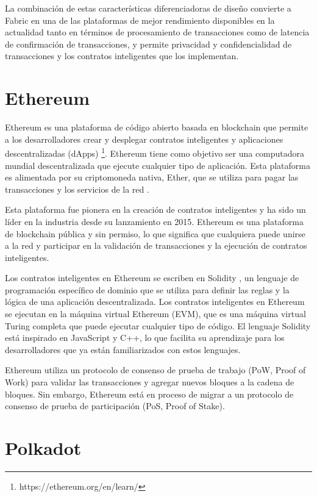 \documentclass[main.tex]{subfiles}
\begin{document}
La combinación de estas características diferenciadoras de diseño convierte a Fabric en una de las plataformas de mejor rendimiento disponibles en la actualidad tanto en términos de procesamiento de transacciones como de latencia de confirmación de transacciones, y permite privacidad y confidencialidad de transacciones y los contratos inteligentes que los implementan.

\section{Ethereum}

Ethereum es una plataforma de código abierto basada en blockchain que permite a los desarrolladores crear y desplegar contratos inteligentes y aplicaciones descentralizadas (dApps) \footnote{https://ethereum.org/en/learn/}. Ethereum tiene como objetivo ser una computadora mundial descentralizada que ejecute cualquier tipo de aplicación. Esta plataforma es alimentada por su criptomoneda nativa, Ether, que se utiliza para pagar las transacciones y los servicios de la red \cite{buterin2013ethereum}.

Esta plataforma fue pionera en la creación de contratos inteligentes y ha sido un líder en la industria desde su lanzamiento en 2015. Ethereum es una plataforma de blockchain pública y sin permiso, lo que significa que cualquiera puede unirse a la red y participar en la validación de transacciones y la ejecución de contratos inteligentes. 

Los contratos inteligentes en Ethereum se escriben en Solidity \cite{dannen2017introducing}, un lenguaje de programación específico de dominio que se utiliza para definir las reglas y la lógica de una aplicación descentralizada. Los contratos inteligentes en Ethereum se ejecutan en la máquina virtual Ethereum (EVM), que es una máquina virtual Turing completa que puede ejecutar cualquier tipo de código. El lenguaje Solidity está inspirado en JavaScript y C++, lo que facilita su aprendizaje para los desarrolladores que ya están familiarizados con estos lenguajes.

Ethereum utiliza un protocolo de consenso de prueba de trabajo (PoW, Proof of Work) para validar las transacciones y agregar nuevos bloques a la cadena de bloques. Sin embargo, Ethereum está en proceso de migrar a un protocolo de consenso de prueba de participación (PoS, Proof of Stake). 

\section{Polkadot}
\end{document}
